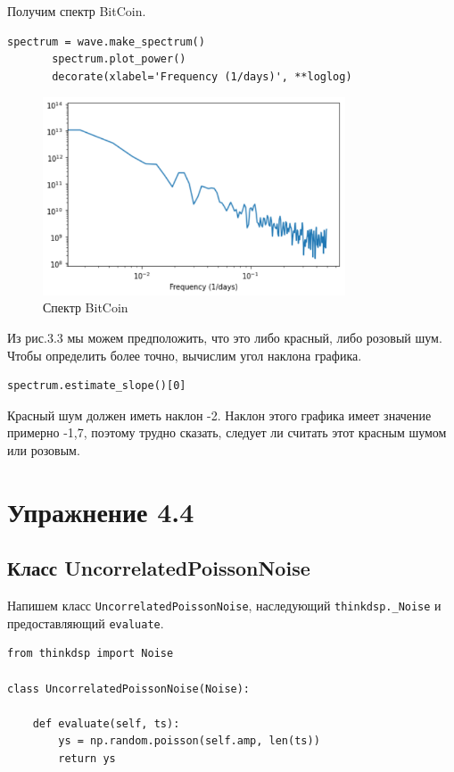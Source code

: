 \documentclass[a4paper,12pt]{report}
\begin{document}
    Получим спектр BitCoin.
\begin{lstlisting}[caption=Вычисление спектра BitCoin]
       spectrum = wave.make_spectrum()
       spectrum.plot_power()
       decorate(xlabel='Frequency (1/days)', **loglog)
\end{lstlisting}
\begin{figure}[H]
        \centering
        \includegraphics[width=0.8\textwidth]{fig3-3.PNG}
        \caption{Спектр BitCoin}
        \label{fig:fig3-3}
\end{figure}

    Из рис.3.3 мы можем предположить, что это либо красный, либо розовый шум. Чтобы определить более точно, вычислим угол наклона графика.
\begin{lstlisting}[caption=Вычисление угла наклона]
       spectrum.estimate_slope()[0]
\end{lstlisting}

    Красный шум должен иметь наклон -2. Наклон этого графика имеет значение примерно -1,7, поэтому трудно сказать, следует ли считать этот красным шумом или розовым.
    
\chapter{Упражнение 4.4}
\section{Класс UncorrelatedPoissonNoise}
    Напишем класс \texttt{UncorrelatedPoissonNoise}, наследующий \texttt{thinkdsp.\_Noise} и предоставляющий \texttt{evaluate}.
\begin{lstlisting}[caption=Класс UncorrelatedPoissonNoise]
from thinkdsp import Noise

class UncorrelatedPoissonNoise(Noise):

    def evaluate(self, ts):
        ys = np.random.poisson(self.amp, len(ts))
        return ys
\end{lstlisting}
\end{document}
